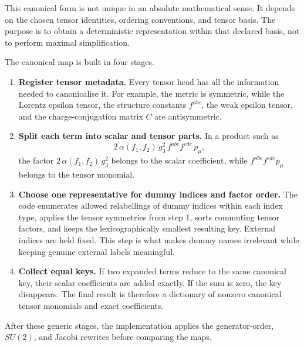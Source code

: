 This canonical form is not unique in an absolute mathematical sense. It depends on the chosen tensor identities, ordering conventions, and tensor basis. The purpose is to obtain a deterministic representation within that declared basis, not to perform maximal simplification.

The canonical map is built in four stages.

\begin{enumerate}
    \item \textbf{Register tensor metadata.} Every tensor head has all the information needed to canonicalise it. For example, the metric is symmetric, while the Lorentz epsilon tensor, the structure constants $f^{abc}$, the weak epsilon tensor, and the charge-conjugation matrix $C$ are antisymmetric.

    \item \textbf{Split each term into scalar and tensor parts.} In a product such as
    \[
        2\, \alpha(f_1,f_2)\, g_3^2\,
        f^{abe} f^{cde}\, p_\mu ,
    \]
    the factor $2\,\alpha(f_1,f_2)\,g_3^2$ belongs to the scalar coefficient, while $f^{abe}f^{cde}p_\mu$ belongs to the tensor monomial.

    \item \textbf{Choose one representative for dummy indices and factor order.} The code enumerates allowed relabellings of dummy indices within each index type, applies the tensor symmetries from step 1, sorts commuting tensor factors, and keeps the lexicographically smallest resulting key. External indices are held fixed. This step is what makes dummy names irrelevant while keeping genuine external labels meaningful.

    \item \textbf{Collect equal keys.} If two expanded terms reduce to the same canonical key, their scalar coefficients are added exactly. If the sum is zero, the key disappears. The final result is therefore a dictionary of nonzero canonical tensor monomials and exact coefficients.
\end{enumerate}

After these generic stages, the implementation applies the generator-order, $SU(2)$, and Jacobi rewrites before comparing the maps.

